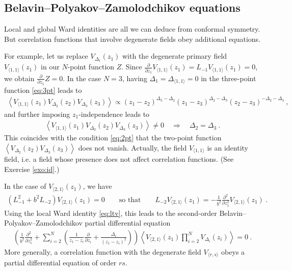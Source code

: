 \documentclass[12pt, a4paper]{article}
\theoremstyle{break}
\begin{document}
\subsection{Belavin--Polyakov--Zamolodchikov equations}

Local and global Ward identities are all we can deduce from conformal symmetry. But correlation functions that involve degenerate fields obey additional equations. 

For example, let us replace $V_{\Delta_1}(z_1)$ with the degenerate primary field $V_{\langle 1, 1 \rangle}(z_1)$
in our $N$-point function $Z$. Since $\frac{\partial}{\partial z_1} V_{\langle 1, 1 \rangle}(z_1) = L_{-1} V_{\langle 1, 1 \rangle}(z_1) =0$,
we obtain $\frac{\partial}{\partial z_1} Z =0$. 
In the case $N=3$, having $\Delta_1=\Delta_{\langle 1,1\rangle}=0$ in the three-point function \eqref{eq:3pt} leads to
\begin{align}
 \left< V_{\langle 1, 1 \rangle}(z_1) V_{\Delta_2}(z_2) V_{\Delta_3}(z_3) \right> \propto (z_1-z_2)^{\Delta_3-\Delta_2} (z_1-z_3)^{\Delta_2-\Delta_3} (z_2-z_3)^{-\Delta_2-\Delta_3}\ , 
\end{align}
and further imposing $z_1$-independence leads to 
\begin{align}
 \left< V_{\langle 1, 1 \rangle}(z_1) V_{\Delta_2}(z_2) V_{\Delta_3}(z_3) \right> \neq 0 \quad \Rightarrow \quad \Delta_2=\Delta_3\ .
 \label{eq:vvvnz}
\end{align}
This coincides with the condition \eqref{eq:2pt} that the two-point function $\left<V_{\Delta_2}(z_2)V_{\Delta_3}(z_3)\right>$ does not vanish. Actually, the field $V_{\langle 1,1\rangle}$ is an identity field, i.e. a field whose presence does not affect correlation functions. (See Exercise \ref{exo:id}.)

In the case of $V_{\langle 2, 1 \rangle}(z_1)$, we have  
\begin{align}
\left(L_{-1}^2 + b^2 L_{-2}\right) V_{\langle 2, 1 \rangle}(z_1)  = 0\qquad \text{so that} \qquad L_{-2}V_{\langle 2, 1 \rangle}(z_1) = -\frac{1}{b^2}\frac{\partial^2}{\partial z_1^2} V_{\langle 2, 1 \rangle}(z_1)\ .
\end{align}
Using the local Ward identity \eqref{eq:ltv},
this leads to the second-order Belavin--Polyakov--Zamolodchikov partial differential equation
\begin{align}
 \left( \frac{1}{b^2}\frac{\partial^2}{\partial z_1^2} + \sum_{i=2}^N\left(\frac{1}{z_1-z_i}\frac{\partial}{\partial z_i} +\frac{\Delta_i}{(z_1-z_i)^2}\right) \right)\left< V_{\langle 2, 1 \rangle}(z_1) \prod_{i=2}^N V_{\Delta_i}(z_i) \right>  = 0\ .
 \label{eq:bpz}
\end{align}
More generally, a correlation function with the degenerate field $V_{\langle r,s\rangle}$ obeys a partial differential equation of order $rs$. 
\end{document}

